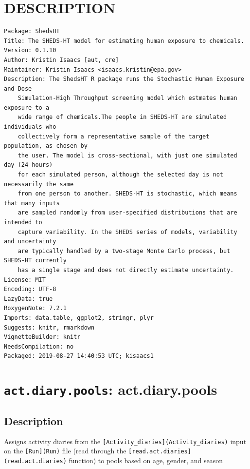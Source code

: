 \documentclass[
]{article}
\author{}
\date{\vspace{-2.5em}}
\begin{document}
\hypertarget{description}{%
\section{DESCRIPTION}\label{description}}

\begin{verbatim}
Package: ShedsHT
Title: The SHEDS-HT model for estimating human exposure to chemicals.
Version: 0.1.10
Author: Kristin Isaacs [aut, cre]
Maintainer: Kristin Isaacs <isaacs.kristin@epa.gov>
Description: The ShedsHT R package runs the Stochastic Human Exposure and Dose
    Simulation-High Throughput screening model which estmates human exposure to a
    wide range of chemicals.The people in SHEDS-HT are simulated individuals who
    collectively form a representative sample of the target population, as chosen by
    the user. The model is cross-sectional, with just one simulated day (24 hours)
    for each simulated person, although the selected day is not necessarily the same
    from one person to another. SHEDS-HT is stochastic, which means that many inputs
    are sampled randomly from user-specified distributions that are intended to
    capture variability. In the SHEDS series of models, variability and uncertainty
    are typically handled by a two-stage Monte Carlo process, but SHEDS-HT currently
    has a single stage and does not directly estimate uncertainty.
License: MIT
Encoding: UTF-8
LazyData: true
RoxygenNote: 7.2.1
Imports: data.table, ggplot2, stringr, plyr
Suggests: knitr, rmarkdown
VignetteBuilder: knitr
NeedsCompilation: no
Packaged: 2019-08-27 14:40:53 UTC; kisaacs1
\end{verbatim}

\hypertarget{act.diary.pools-act.diary.pools}{%
\section{\texorpdfstring{\texttt{act.diary.pools}:
act.diary.pools}{act.diary.pools: act.diary.pools}}\label{act.diary.pools-act.diary.pools}}

\hypertarget{description-1}{%
\subsection{Description}\label{description-1}}

Assigns activity diaries from the
\texttt{{[}Activity\_diaries{]}(Activity\_diaries)} input on the
\texttt{{[}Run{]}(Run)} file (read through the
\texttt{{[}read.act.diaries{]}(read.act.diaries)} function) to pools
based on age, gender, and season
\end{document}
